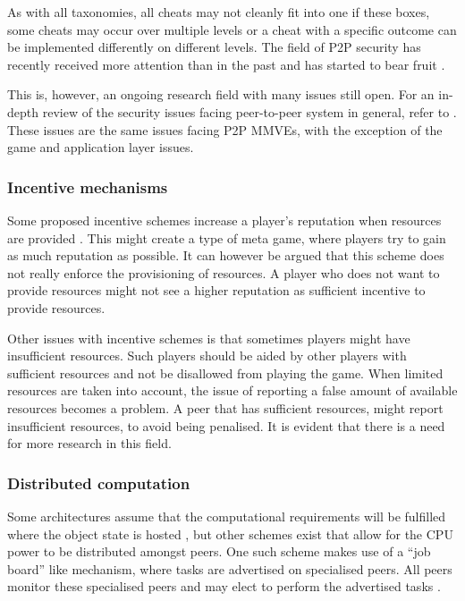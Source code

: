 As with all taxonomies, all cheats may not cleanly fit into one if these boxes, some cheats may occur over multiple levels or a cheat with a specific outcome can be implemented differently on different levels. The field of P2P security has recently received more attention than in the past and has started to bear fruit \cite{survey_p2p_game_cheats}.

This is, however, an ongoing research field with many issues still open. For an in-depth review of the security issues facing peer-to-peer system in general, refer to \cite{p2p_security_issues}. These issues are the same issues facing P2P MMVEs, with the exception of the game and application layer issues.

\subsubsection{Incentive mechanisms}

Some proposed incentive schemes increase a player's reputation when resources are provided  \cite{classic_p2p_reputation} \cite{proactive_reputation}. This might create a type of meta game, where players try to gain as much reputation as possible. It can however be argued that this scheme does not really enforce the provisioning of resources. A player who does not want to provide resources might not see a higher reputation as sufficient incentive to provide resources.

Other issues with incentive schemes is that sometimes players might have insufficient resources. Such players should be aided by other players with sufficient resources and not be disallowed from playing the game. When limited resources are taken into account, the issue of reporting a false amount of available resources becomes a problem. A peer that has sufficient resources, might report insufficient resources, to avoid being penalised. It is evident that there is a need for more research in this field.

\subsubsection{Distributed computation}
\label{distributed_computing_challenge}

Some architectures assume that the computational requirements will be fulfilled where the object state is hosted \cite{solipsis}, but other schemes exist that allow for the CPU power to be distributed amongst peers. One such scheme makes use of a ``job board'' like mechanism, where tasks are advertised on specialised peers. All peers monitor these specialised peers and may elect to perform the advertised tasks \cite{fan_mediator_paper}.


